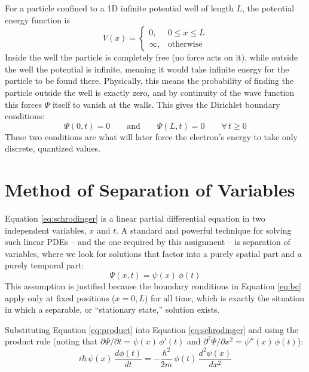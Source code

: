 \documentclass[12pt, a4paper]{article}
\begin{document}
For a particle confined to a 1D infinite potential well of length $L$,
the potential energy function is
\begin{equation}
    V(x) =
    \begin{cases}
        0, & 0 \le x \le L \\
        \infty, & \text{otherwise}
    \end{cases}
    \label{eq:potential}
\end{equation}
Inside the well the particle is completely free (no force acts on it),
while outside the well the potential is infinite, meaning it would
take infinite energy for the particle to be found there. Physically,
this means the probability of finding the particle outside the well is
exactly zero, and by continuity of the wave function this forces
$\Psi$ itself to vanish at the walls. This gives the Dirichlet
boundary conditions:
\begin{equation}
    \Psi(0,t) = 0 \qquad \text{and} \qquad \Psi(L,t) = 0 \qquad \forall\, t \ge 0
    \label{eq:bc}
\end{equation}
These two conditions are what will later force the electron's energy
to take only discrete, quantized values.

\section{Method of Separation of Variables}
Equation \eqref{eq:schrodinger} is a linear partial differential
equation in two independent variables, $x$ and $t$. A standard and
powerful technique for solving such linear PDEs -- and the one
required by this assignment -- is separation of variables, where we
look for solutions that factor into a purely spatial part and a purely
temporal part:
\begin{equation}
    \Psi(x,t) = \psi(x)\,\phi(t)
    \label{eq:product}
\end{equation}
This assumption is justified because the boundary conditions in
Equation \eqref{eq:bc} apply only at fixed positions ($x=0,L$) for all
time, which is exactly the situation in which a separable, or
``stationary state,'' solution exists.

Substituting Equation \eqref{eq:product} into Equation
\eqref{eq:schrodinger} and using the product rule (noting that
$\partial \Psi/\partial t = \psi(x)\,\phi'(t)$ and
$\partial^2 \Psi/\partial x^2 = \psi''(x)\,\phi(t)$):
\begin{equation}
    i\hbar\, \psi(x)\,\frac{d\phi(t)}{dt}
    = -\frac{\hbar^2}{2m}\, \phi(t)\, \frac{d^2\psi(x)}{dx^2}
    \label{eq:substituted}
\end{equation}
\end{document}
